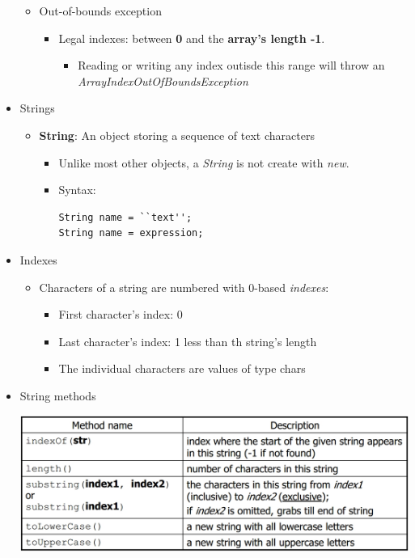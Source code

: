 \documentclass[a4paper]{article}
\begin{document}
\begin{itemize}
\begin{itemize}
      \item Out-of-bounds exception
        \begin{itemize}
        \item Legal indexes: between \textbf{0} and the \textbf{array's length -1}.
          \begin{itemize}
            \item Reading or writing any index outisde this range will throw an \textit{ArrayIndexOutOfBoundsException}
          \end{itemize}
        \end{itemize}
  \end{itemize}
  \item Strings
    \begin{itemize}
      \item \textbf{String}: An object storing a sequence of text characters
        \begin{itemize}
          \item Unlike most other objects, a \textit{String} is not create with \textit{new}.
          \item Syntax:
\begin{lstlisting}
String name = ``text'';
String name = expression;
\end{lstlisting} 
        \end{itemize}
    \end{itemize}
    \item Indexes
    \begin{itemize}
      \item Characters of a string are numbered with 0-based \textit{indexes}:
      \begin{itemize}
        \item First character's index: 0
        \item Last character's index: 1 less than th string's length
        \item The individual characters are values of type chars
      \end{itemize}
      \end{itemize}
      \item String methods\\
      \begin{center}
        \includegraphics[scale=1]{Figures/StringMethods.jpg} 

\end{center}
\end{itemize}
\end{document}
